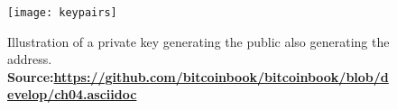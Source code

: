 \begin{figure}[!htbp]
    \centering
    \texttt{[image: keypairs]}
    \caption[Illustration of a private key generating the public also generating the address]
    {Illustration of a private key generating the public also generating the address. \\ \textbf{Source:\url{https://github.com/bitcoinbook/bitcoinbook/blob/develop/ch04.asciidoc}}}
    \label{fig:keypairs}
\end{figure}
    